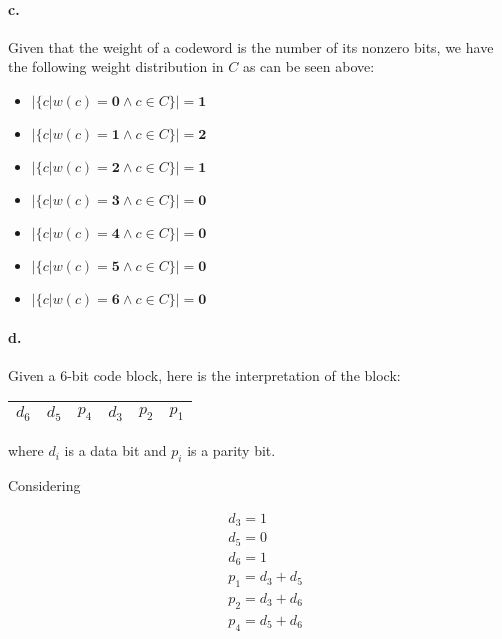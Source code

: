 \documentclass{article}
\begin{document}
\paragraph{c.} Given that the weight of a codeword is the number of its nonzero
bits, we have the following weight distribution in $C$ as can be seen above:

\begin{itemize}
  \item $|\{c|w(c)=\textbf{0} \land c \in C\}| = \textbf{1}$
  \item $|\{c|w(c)=\textbf{1} \land c \in C\}| = \textbf{2}$
  \item $|\{c|w(c)=\textbf{2} \land c \in C\}| = \textbf{1}$
  \item $|\{c|w(c)=\textbf{3} \land c \in C\}| = \textbf{0}$
  \item $|\{c|w(c)=\textbf{4} \land c \in C\}| = \textbf{0}$
  \item $|\{c|w(c)=\textbf{5} \land c \in C\}| = \textbf{0}$
  \item $|\{c|w(c)=\textbf{6} \land c \in C\}| = \textbf{0}$
\end{itemize}

\paragraph{d.} Given a 6-bit code block, here is the interpretation of the block:

\begin{center}
  \begin{tabular}{|c|c|c|c|c|c|}
    \hline
    \cellcolor{YellowGreen} $d_6$ & \cellcolor{YellowGreen} $d_5$ & \cellcolor{GreenYellow} $p_4$ & \cellcolor{YellowGreen} $d_3$ & \cellcolor{GreenYellow} $p_2$ & \cellcolor{GreenYellow} $p_1$ \\
    \hline
  \end{tabular}
\end{center}

where $d_i$ is a data bit and $p_i$ is a parity bit.

Considering

\begin{align*}
  & d_3 = 1 \\
  & d_5 = 0 \\
  & d_6 = 1 \\
  & p_1 = d_3 + d_5 \\
  & p_2 = d_3 + d_6 \\
  & p_4 = d_5 + d_6 \\
\end{align*}
\end{document}
